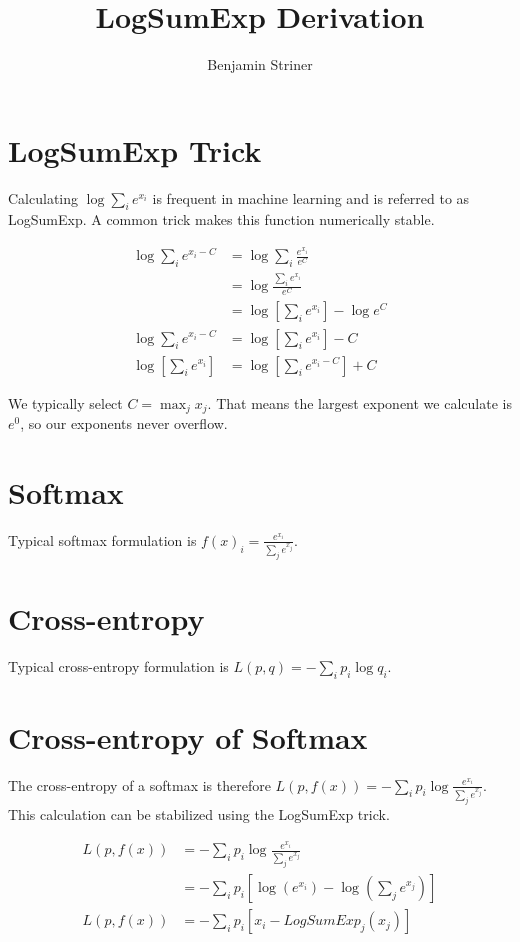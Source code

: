 \documentclass{article}
\begin{document}
\title{LogSumExp Derivation}
\author{Benjamin Striner}

\maketitle

\section{LogSumExp Trick}

Calculating $\log \sum_i e^{x_i} $ is frequent in machine learning and is referred to as LogSumExp. A common trick makes this function numerically stable.

\begin{align}
\log \sum_i e^{x_i - C} &= \log \sum_i \frac{e^{x_i}}{e^{C}} \\
& = \log \frac{\sum_i e^{x_i}}{e^C} \\
& = \log[\sum_i e^{x_i}] - \log e^{C} \\
\log \sum_i e^{x_i - C} & = \log[\sum_i e^{x_i}] - C \\
\log[\sum_i e^{x_i}] &= \log[\sum_i e^{x_i - C}]  + C
\end{align}

We typically select $ C=\max_j x_j $. That means the largest exponent we calculate is $e^0$, so our exponents never overflow.

\section{Softmax}

Typical softmax formulation is $ f(x)_i = \frac{e^{x_i}}{\sum_j e^{x_j}} $.

\section{Cross-entropy}

Typical cross-entropy formulation is $ L(p, q) = -\sum_i p_i \log q_i$.

\section{Cross-entropy of Softmax}

The cross-entropy of a softmax is therefore $L(p,f(x))=- \sum_i p_i \log \frac{e^{x_i}}{\sum_j e^{x_j}}$. This calculation can be stabilized using the LogSumExp trick.

\begin{align}
L(p,f(x)) &=- \sum_i p_i \log \frac{e^{x_i}}{\sum_j e^{x_j}} \\
& = -\sum_i p_i [ \log(e^{x_i}) - \log(\sum_j e^{x_j})] \\
L(p,f(x)) &= -\sum_i p_i [ x_i - LogSumExp_j(x_j)]
\end{align}
\end{document}
